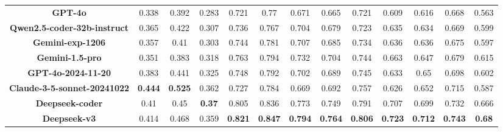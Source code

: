\begin{table*}[t]
{\begin{tabular}{ccccccccccccc}
\textbf{GPT-4o} & 0.338 & 0.392 & 0.283 & 0.721 & 0.77 & 0.671 & 0.665 & 0.721 & 0.609 & 0.616 & 0.668 & 0.563\\
\textbf{Qwen2.5-coder-32b-instruct} & 0.365 & 0.422 & 0.307 & 0.736 & 0.767 & 0.704 & 0.679 & 0.723 & 0.635 & 0.634 & 0.669 & 0.599\\
\textbf{Gemini-exp-1206} & 0.357 & 0.41 & 0.303 & 0.744 & 0.781 & 0.707 & 0.685 & 0.734 & 0.636 & 0.636 & 0.675 & 0.597\\
\textbf{Gemini-1.5-pro} & 0.351 & 0.383 & 0.318 & 0.763 & 0.794 & 0.732 & 0.704 & 0.744 & 0.663 & 0.647 & 0.679 & 0.615\\
\textbf{GPT-4o-2024-11-20} & 0.383 & 0.441 & 0.325 & 0.748 & 0.792 & 0.702 & 0.689 & 0.745 & 0.633 & 0.65 & 0.698 & 0.602\\
\textbf{Claude-3-5-sonnet-20241022} & \textbf{0.444} & \textbf{0.525} & 0.362 & 0.727 & 0.784 & 0.669 & 0.692 & 0.757 & 0.626 & 0.652 & 0.715 & 0.587\\
\textbf{Deepseek-coder} & 0.41 & 0.45 & \textbf{0.37} & 0.805 & 0.836 & 0.773 & 0.749 & 0.791 & 0.707 & 0.699 & 0.732 & 0.666\\
\textbf{Deepseek-v3} & 0.414 & 0.468 & 0.359 & \textbf{0.821} & \textbf{0.847} & \textbf{0.794} & \textbf{0.764} & \textbf{0.806} & \textbf{0.723} & \textbf{0.712} & \textbf{0.743} & \textbf{0.68}\\

\bottomrule
\end{tabular}}
\label{tab:codeIF_evaluation_all}
\end{table*}




